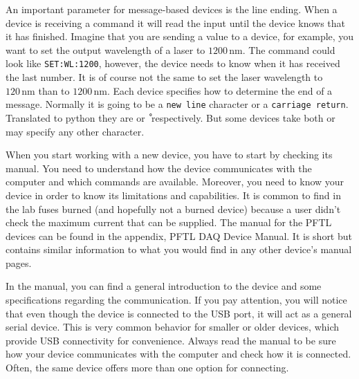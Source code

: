 An important parameter for message-based devices is the line ending.
When a device is receiving a command it will read the input until the
device knows that it has finished. Imagine that you are sending a
value to a device, for example, you want to set the output wavelength of
a laser to $1200\,\textrm{nm}$. The command could look like 
\texttt{SET:WL:1200},
however, the device needs to know when it has received the last number.
It is of course not the same to set the laser wavelength to $120\,\textrm{nm}$ 
than to $1200\,\textrm{nm}$. Each device specifies how to determine the end of a 
message. Normally it is going to be a \texttt{new line} character or a
\texttt{carriage return}. Translated to python they are
\texttt{\n} or \texttt{\r} respectively.
But some devices take both or may specify any other character.



When you start working with a new device, you have to start by checking
its manual. You need to understand how the device communicates with the
computer and which commands are available. Moreover, you need to know
your device in order to know its limitations and capabilities. It is
common to find in the lab fuses burned (and hopefully not a burned
device) because a user didn't check the maximum current that can be
supplied. The manual for the PFTL devices can be
found in the appendix, PFTL DAQ Device Manual. It is short but contains similar information to what you
would find in any other device's manual pages.

In the manual, you can find a general introduction to the device and
some specifications regarding the communication. If you pay attention,
you will notice that even though the device is connected to the {USB}
port, it will act as a general serial device. This is very common
behavior for smaller or older devices, which provide {USB} connectivity
for convenience. Always read the manual to be sure how your device
communicates with the computer and check how it is connected. Often, the
same device offers more than one option for connecting.

